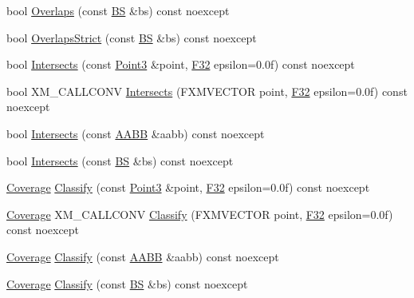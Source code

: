\begin{DoxyCompactItemize}
\item 
bool \hyperlink{structmage_1_1_a_a_b_b_ac105ff686890e3fbb36bb230c663bde9}{Overlaps} (const \hyperlink{structmage_1_1_b_s}{BS} \&bs) const noexcept
\item 
bool \hyperlink{structmage_1_1_a_a_b_b_ac2f7270ec51acb91aed4965f135a53a9}{Overlaps\+Strict} (const \hyperlink{structmage_1_1_b_s}{BS} \&bs) const noexcept
\item 
bool \hyperlink{structmage_1_1_a_a_b_b_a09bae994f8a68a15610b3ed9b73ae2aa}{Intersects} (const \hyperlink{structmage_1_1_point3}{Point3} \&point, \hyperlink{namespacemage_aa97e833b45f06d60a0a9c4fc22ae02c0}{F32} epsilon=0.\+0f) const noexcept
\item 
bool X\+M\+\_\+\+C\+A\+L\+L\+C\+O\+NV \hyperlink{structmage_1_1_a_a_b_b_a3a9767d51d0f4e1e6014b114dce432b0}{Intersects} (F\+X\+M\+V\+E\+C\+T\+OR point, \hyperlink{namespacemage_aa97e833b45f06d60a0a9c4fc22ae02c0}{F32} epsilon=0.\+0f) const noexcept
\item 
bool \hyperlink{structmage_1_1_a_a_b_b_a9c776b78b3125957bafc9ee99f7eedee}{Intersects} (const \hyperlink{structmage_1_1_a_a_b_b}{A\+A\+BB} \&aabb) const noexcept
\item 
bool \hyperlink{structmage_1_1_a_a_b_b_ac51fa4b4d3100d587c6a2d2b5513ad88}{Intersects} (const \hyperlink{structmage_1_1_b_s}{BS} \&bs) const noexcept
\item 
\hyperlink{namespacemage_aa9fe157e5a578a103160266df8cccb0a}{Coverage} \hyperlink{structmage_1_1_a_a_b_b_a4397eb9619f0c414dcb11819196784ed}{Classify} (const \hyperlink{structmage_1_1_point3}{Point3} \&point, \hyperlink{namespacemage_aa97e833b45f06d60a0a9c4fc22ae02c0}{F32} epsilon=0.\+0f) const noexcept
\item 
\hyperlink{namespacemage_aa9fe157e5a578a103160266df8cccb0a}{Coverage} X\+M\+\_\+\+C\+A\+L\+L\+C\+O\+NV \hyperlink{structmage_1_1_a_a_b_b_adb9b0a7b1aed99aa86708a84c5937859}{Classify} (F\+X\+M\+V\+E\+C\+T\+OR point, \hyperlink{namespacemage_aa97e833b45f06d60a0a9c4fc22ae02c0}{F32} epsilon=0.\+0f) const noexcept
\item 
\hyperlink{namespacemage_aa9fe157e5a578a103160266df8cccb0a}{Coverage} \hyperlink{structmage_1_1_a_a_b_b_a835279b552703bd72fa19856ad27cbd7}{Classify} (const \hyperlink{structmage_1_1_a_a_b_b}{A\+A\+BB} \&aabb) const noexcept
\item 
\hyperlink{namespacemage_aa9fe157e5a578a103160266df8cccb0a}{Coverage} \hyperlink{structmage_1_1_a_a_b_b_a3092e0f6765695222f78bcfd78d67a6b}{Classify} (const \hyperlink{structmage_1_1_b_s}{BS} \&bs) const noexcept
\end{DoxyCompactItemize}
